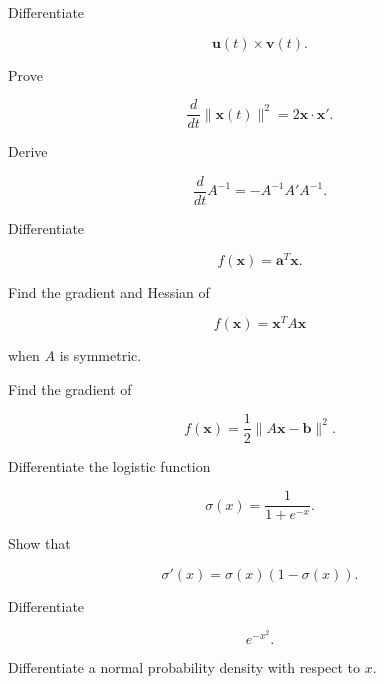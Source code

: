 \begin{exercise}[3]
Differentiate

\[
\mathbf{u}(t)\times\mathbf{v}(t).
\]
\end{exercise}

\begin{exercise}[3]
Prove

\[
\frac{d}{dt}
\|\mathbf{x}(t)\|^2
=
2\mathbf{x}\cdot\mathbf{x}'.
\]
\end{exercise}

\begin{exercise}[3]
Derive

\[
\frac{d}{dt}
A^{-1}
=
-A^{-1}A'A^{-1}.
\]
\end{exercise}

\begin{exercise}[3]
Differentiate

\[
f(\mathbf{x})
=
\mathbf{a}^T\mathbf{x}.
\]
\end{exercise}

\begin{exercise}[3]
Find the gradient and Hessian of

\[
f(\mathbf{x})
=
\mathbf{x}^TA\mathbf{x}
\]

when \(A\) is symmetric.
\end{exercise}

\begin{exercise}[3]
Find the gradient of

\[
f(\mathbf{x})
=
\frac12
\|A\mathbf{x}-\mathbf{b}\|^2.
\]
\end{exercise}

\begin{exercise}[3]
Differentiate the logistic function

\[
\sigma(x)
=
\frac1{1+e^{-x}}.
\]
\end{exercise}

\begin{exercise}[3]
Show that

\[
\sigma'(x)
=
\sigma(x)(1-\sigma(x)).
\]
\end{exercise}

\begin{exercise}[3]
Differentiate

\[
e^{-x^2}.
\]
\end{exercise}

\begin{exercise}[3]
Differentiate a normal probability density with respect to \(x\).
\end{exercise}

